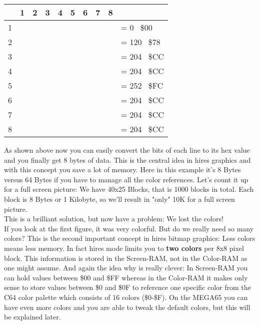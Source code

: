 \setlength\minrowclearance{4pt}
\begin{tabular}{m{4pt}|m{4pt}m{4pt}m{4pt}m{4pt}m{4pt}m{4pt}m{4pt}m{4pt}m{70pt}}
	& 1 & 2 & 3& 4& 5& 6& 7& 8 &\\\hline
	
	1 & \blk  & \blk  & \blk  & \blk  & \blk  & \blk  & \blk & \blk & = 0 \to\ \$00 \\	
	2 & \blk  & \redb & \redb & \redb & \redb & \blk  & \blk & \blk & = 120 \to\ \$78 \\	
	3 & \redb & \redb & \blk  & \blk  & \redb & \redb & \blk & \blk & = 204 \to\ \$CC \\	
	4 & \redb & \redb & \blk  & \blk  & \redb & \redb & \blk & \blk & = 204 \to\ \$CC \\	
	5 & \redb & \redb & \redb & \redb & \redb & \redb & \blk & \blk & = 252 \to\ \$FC \\	
	6 & \redb & \redb & \blk  & \blk  & \redb & \redb & \blk & \blk & = 204 \to\ \$CC \\	
	7 & \redb & \redb & \blk  & \blk  & \redb & \redb & \blk & \blk & = 204 \to\ \$CC \\	
	8 & \redb & \redb & \blk  & \blk  & \redb & \redb & \blk & \blk & = 204 \to\ \$CC \\	
	
\end{tabular}


As shown above now you can easily convert the bits of each line to its hex value and you finally get 8 bytes of data. This is the central idea in hires graphics and with this concept you save a lot of memory. Here in this example it's 8 Bytes versus 64 Bytes if you have to manage all the color references.
Let's count it up for a full screen picture: We have 40x25 Blocks, that is 1000 blocks in total. Each block is 8 Bytes or 1 Kilobyte, so we'll result in "only" 10K for a full screen picture.\\ 

This is a brilliant solution, but now have a problem: We lost the colors!\\

If you look at the first figure, it was very colorful. But do we really need so many colors? This is the second important concept in hires bitmap graphics: Less colors means less memory. In fact hires mode limits you to \textbf{two colors} per 8x8 pixel block. This information is stored in the Screen-RAM, not in the Color-RAM as one might assume. And again the idea why is really clever: In Screen-RAM you can hold values between \$00 and \$FF whereas in the Color-RAM it makes only sense to store values between \$0 and \$0F to reference one specific color from the C64 color palette which consists of 16 colors (\$0-\$F). On the MEGA65 you can have even more colors and you are able to tweak the default colors, but this will be explained later.\\
 
